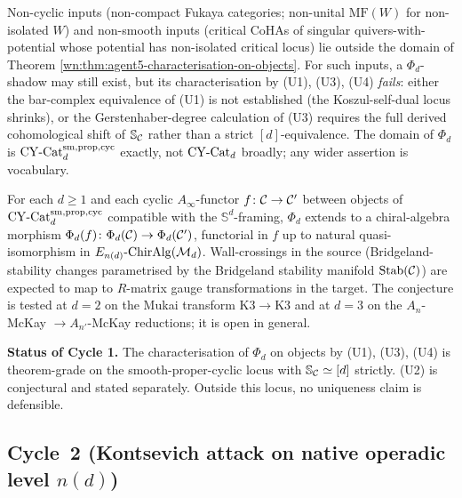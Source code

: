 \begin{remark}
\label{wn:rem:agent5-out-of-scope-inputs}
Non-cyclic inputs (non-compact Fukaya categories; non-unital
$\mathrm{MF}(W)$ for non-isolated $W$) and non-smooth inputs (critical
CoHAs of singular quivers-with-potential whose potential has non-isolated
critical locus) lie outside the domain of Theorem
\ref{wn:thm:agent5-characterisation-on-objects}. For such inputs, a
$\Phi_d$-shadow may still exist, but its characterisation by (U1),
(U3), (U4) \emph{fails}: either the bar-complex equivalence of (U1)
is not established (the Koszul-self-dual locus shrinks), or the
Gerstenhaber-degree calculation of (U3) requires the full derived
cohomological shift of $\mathbb{S}_{\mathcal{C}}$ rather than a strict
$[d]$-equivalence. The domain of $\Phi_d$ is $\mathrm{CY}\text{-}\mathrm{Cat}_d^{\mathrm{sm,prop,cyc}}$
exactly, not $\mathrm{CY}\text{-}\mathrm{Cat}_d$ broadly; any wider assertion is vocabulary.
\end{remark}

\begin{conjecture}
\label{wn:conj:agent5-phi-d-functoriality}
\ClaimStatusConjectured
For each $d \ge 1$ and each cyclic $A_\infty$-functor
$f \colon \mathcal{C} \to \mathcal{C}'$ between objects of
$\mathrm{CY}\text{-}\mathrm{Cat}_d^{\mathrm{sm,prop,cyc}}$ compatible with the $\mathbb{S}^d$-framing,
$\Phi_d$ extends to a chiral-algebra morphism
$\Phi_d(f) \colon \Phi_d(\mathcal{C}) \to \Phi_d(\mathcal{C}')$, functorial in $f$ up to
natural quasi-isomorphism in $E_{n(d)}\text{-}\mathrm{ChirAlg}(\mathcal{M}_d)$.
Wall-crossings in the source (Bridgeland-stability changes parametrised
by the Bridgeland stability manifold $\mathrm{Stab}(\mathcal{C})$) are expected
to map to $R$-matrix gauge transformations in the target. The
conjecture is tested at $d = 2$ on the Mukai transform
$\mathrm{K3} \to \mathrm{K3}$ and at $d = 3$ on the $A_n$-McKay
$\to A_{n'}$-McKay reductions; it is open in general.
\end{conjecture}

\medskip
\noindent\textbf{Status of Cycle 1.} The characterisation of $\Phi_d$
on objects by (U1), (U3), (U4) is theorem-grade on the smooth-proper-cyclic
locus with $\mathbb{S}_{\mathcal{C}} \simeq [d]$ strictly. (U2) is conjectural and
stated separately. Outside this locus, no uniqueness claim is defensible.

\subsection*{Cycle~2 (Kontsevich attack on native operadic level $n(d)$)}


